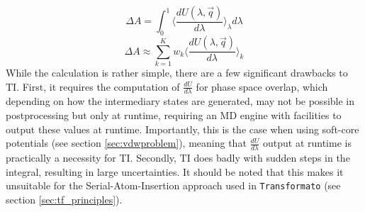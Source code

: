 \documentclass[oneside]{scrreprt}
\begin{document}
\begin{equation} \label{eq:ti_integration}
    \Delta A=\int_0^1 \biggl \langle\frac{dU(\lambda,\Vec{q})}{d\lambda} \biggr \rangle_{\lambda} d\lambda 
\end{equation}
\begin{equation} \label{eq:ti_approximation}
    \Delta A \approx \sum_{k=1}^K w_k \biggl \langle\frac{dU(\lambda,\Vec{q})}{d\lambda} \biggr \rangle_{k}
\end{equation}
While the calculation is rather simple, there are a few significant drawbacks to TI. First, it requires the computation of $\frac{dU}{d\lambda}$ for phase space overlap, which depending on how the intermediary states are generated, may not be possible in postprocessing but only at runtime, requiring an MD engine with facilities to output these values at runtime. Importantly, this is the case when using soft-core potentials (see section \ref{sec:vdwproblem}), meaning that $\frac{dU}{d\lambda}$ output at runtime is practically a necessity for TI. Secondly, TI does badly with sudden steps in the integral, resulting in large uncertainties. It should be noted that this makes it unsuitable for the Serial-Atom-Insertion approach used in \texttt{Transformato} (see section \ref{sec:tf_principles}).
\end{document}

